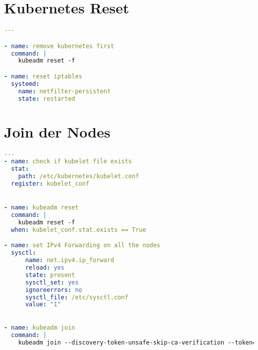 \section{Kubernetes Reset}
\label{app:reset}
\begin{lstlisting}[language=yaml, caption={reset role}]
---

- name: remove kubernetes first
  command: |
    kubeadm reset -f

- name: reset iptables
  systemd:
    name: netfilter-persistent
    state: restarted
\end{lstlisting}

\section{Join der Nodes}
\label{app:join_role}
\begin{lstlisting}[language=yaml, caption={join role}]
---
- name: check if kubelet file exists
  stat: 
    path: /etc/kubernetes/kubelet.conf
  register: kubelet_conf


- name: kubeadm reset 
  command: |
    kubeadm reset -f
  when: kubelet_conf.stat.exists == True

- name: set IPv4 Forwarding on all the nodes
  sysctl:
      name: net.ipv4.ip_forward 
      reload: yes
      state: present 
      sysctl_set: yes
      ignoreerrors: no 
      sysctl_file: /etc/sysctl.conf
      value: "1" 
    

- name: kubeadm join
  command: |
    kubeadm join --discovery-token-unsafe-skip-ca-verification --token={{ token }} k8smaster:6443
\end{lstlisting}

